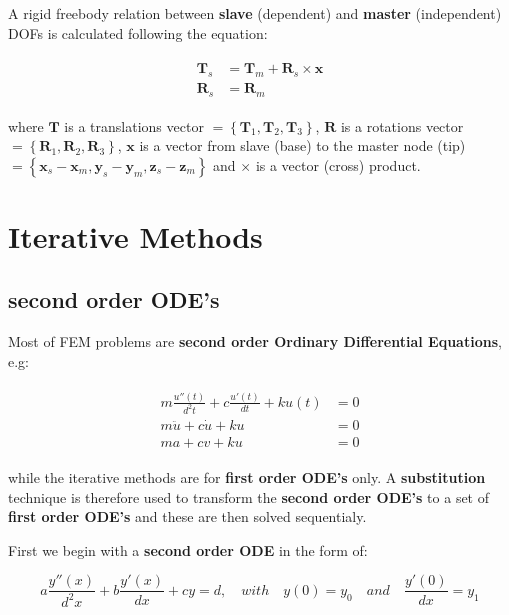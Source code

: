 \documentclass[10pt,b5paper,titlepage]{book}
\newenvironment{eqarray}
{
    \begin{eqnarray}
        \begin{aligned}
}
{
        \end{aligned}
    \end{eqnarray}
}
\begin{document}
A rigid freebody relation between \textbf{slave} (dependent) and \textbf{master}
(independent) DOFs is calculated following the equation:

\begin{eqarray}\label{freebody-master-slave}
    \mathbf{T}_s &= \mathbf{T}_m + \mathbf{R}_s \times \mathbf{x}\\
    \mathbf{R}_s &= \mathbf{R}_m
\end{eqarray}

where
$ \mathbf{T} $ is a translations vector
$ = \left\{ \mathbf{T}_1, \mathbf{T}_2,  \mathbf{T}_3 \right\} $,
$ \mathbf{R} $ is a rotations vector
$ = \left\{ \mathbf{R}_1, \mathbf{R}_2,  \mathbf{R}_3 \right\} $,
$ \mathbf{x} $ is a vector from slave (base) to the master node (tip)
$ = \left\{ \mathbf{x}_s - \mathbf{x}_m,  \mathbf{y}_s - \mathbf{y}_m,
\mathbf{z}_s - \mathbf{z}_m \right\} $ and
$ \times $ is a vector (cross) product.



\chapter{Iterative Methods}

\section{second order ODE's}

Most of FEM problems are \textbf{second order Ordinary Differential Equations}, e.g:

\begin{eqarray}
    m \frac{u''(t)}{d^2 t} + c \frac{u'(t)}{dt} + k u(t) &= 0\\
    m \ddot{u} + c \dot{u} + k u &= 0\\
    m a + c v + ku &= 0
\end{eqarray}

while the iterative methods are for \textbf{first order ODE's} only.
A \textbf{substitution} technique is therefore used to transform the
\textbf{second order ODE's} to a set of \textbf{first order ODE's} and these are
then solved sequentialy.

First we begin with a \textbf{second order ODE} in the form of:

\begin{equation}
    a \frac{y''(x)}{d^2 x} + b \frac{y'(x)}{dx} + c y = d, \quad with \quad y(0) = y_0 \quad and \quad
    \frac{y'(0)}{dx} = y_1
\end{equation}
\end{document}
